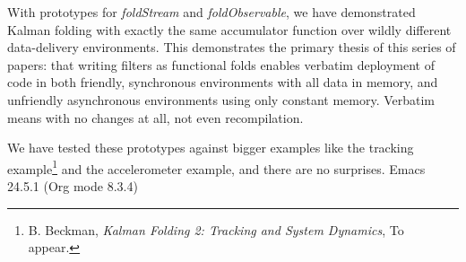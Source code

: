 \documentclass[10pt,oneside,x11names]{article}
\begin{document}
With prototypes for \emph{foldStream} and \emph{foldObservable}, we have demonstrated
Kalman folding with exactly the same accumulator function over wildly different
data-delivery environments. This demonstrates the primary thesis of this series
of papers: that writing filters as functional folds enables verbatim deployment
of code in both friendly, synchronous environments with all data in memory, and
unfriendly asynchronous environments using only constant memory. Verbatim means
with no changes at all, not even recompilation. 

We have tested these prototypes against bigger
examples like the tracking example\footnote{B. Beckman, \emph{Kalman Folding 2: Tracking and System Dynamics}, To appear.} and the accelerometer
example,\footnotemark[1]{} and there are no surprises.
Emacs 24.5.1 (Org mode 8.3.4)
\end{document}
